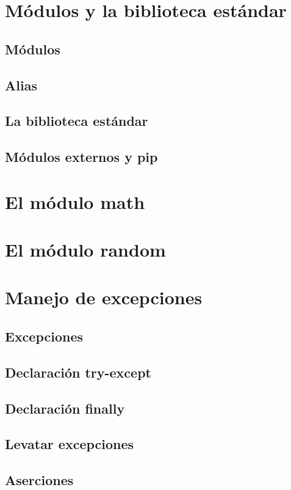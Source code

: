 \documentclass{article}
\begin{document}
    \section{Módulos y la biblioteca estándar}

      \subsection{Módulos}
      \subsection{Alias}
      \subsection{La biblioteca estándar}
      \subsection{Módulos externos y pip}
    
    \section{El módulo math}

    \section{El módulo random}

    \section{Manejo de excepciones}

      \subsection{Excepciones}
      \subsection{Declaración try-except}
      \subsection{Declaración finally}
      \subsection{Levatar excepciones}
      \subsection{Aserciones}
\end{document}

